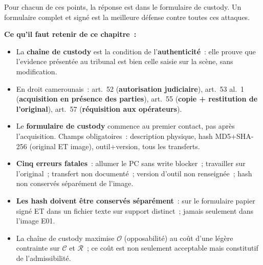 Pour chacun de ces points, la réponse est dans le formulaire de custody.
Un formulaire complet et signé est la meilleure défense contre toutes
ces attaques.

\separateur

\begin{boxresume}
\textbf{Ce qu'il faut retenir de ce chapitre~:}
\begin{itemize}
    \item La \textbf{chaîne de custody} est la condition de l'\textbf{authenticité}~:
          elle prouve que l'evidence présentée au tribunal est bien celle saisie
          sur la scène, sans modification.

    \item En droit camerounais~: art.~52 (\textbf{autorisation judiciaire}),
          art.~53 al.~1 (\textbf{acquisition en présence des parties}),
          art.~55 (\textbf{copie + restitution de l'original}),
          art.~57 (\textbf{réquisition aux opérateurs}).

    \item Le \textbf{formulaire de custody} commence au premier contact,
          pas après l'acquisition. Champs obligatoires~: description physique,
          hash MD5+SHA-256 (original ET image), outil+version, tous les transferts.

    \item \textbf{Cinq erreurs fatales}~: allumer le PC sans write blocker~;
          travailler sur l'original~; transfert non documenté~; version d'outil
          non renseignée~; hash non conservés séparément de l'image.

    \item \textbf{Les hash doivent être conservés séparément}~: sur le formulaire
          papier signé ET dans un fichier texte sur support distinct~; jamais
          seulement dans l'image E01.

    \item La chaîne de custody maximise $\mathcal{O}$ (opposabilité) au coût
          d'une légère contrainte sur $\mathcal{C}$ et $\mathcal{R}$~; ce coût
          est non seulement acceptable mais constitutif de l'admissibilité.
\end{itemize}
\end{boxresume}

\bigskip

